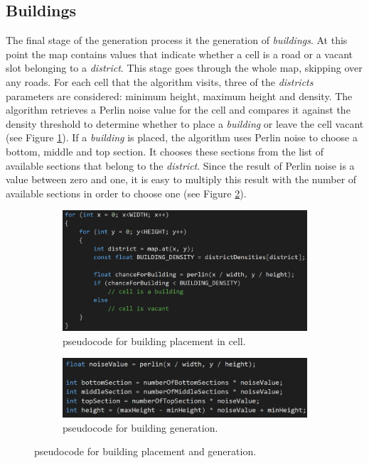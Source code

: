 	\subsection{Buildings}
		The final stage of the generation process it the generation of \textit{buildings}. At this point the map contains values that indicate whether a cell is a road or a vacant slot belonging to a \textit{district}. This stage goes through the whole map, skipping over any roads. For each cell that the algorithm visits, three of the \textit{districts} parameters are considered: minimum height, maximum height and density. The algorithm retrieves a Perlin noise value for the cell and compares it against the density threshold to determine whether to place a \textit{building} or leave the cell vacant (see Figure \ref{fig:vacant-code}). If a \textit{building} is placed, the algorithm uses Perlin noise to choose a bottom, middle and top section. It chooses these sections from the list of available sections that belong to the \textit{district}. Since the result of Perlin noise is a value between zero and one, it is easy to multiply this result with the number of available sections in order to choose one (see Figure \ref{fig:section-code}).
		
	\begin{figure}[h]
		\begin{subfigure}{0.5\textwidth}
			\centering
			\includegraphics[width=0.95\linewidth]{"Images/vacant code"}
			\caption{pseudocode for building placement in cell.}
			\label{fig:vacant-code}
		\end{subfigure}
		\begin{subfigure}{0.5\textwidth}
			\centering
			\includegraphics[width=0.95\linewidth]{"Images/section code"}
			\caption{pseudocode for building generation.}
			\label{fig:section-code}
		\end{subfigure}
			\caption{pseudocode for building placement and generation.}
			\label{fig:pseudo-code-buildings}
	\end{figure}
		
